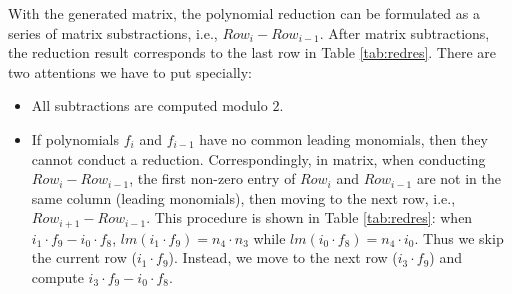 \begin{Example}
	With the generated matrix, the polynomial reduction can be formulated as a series of matrix substractions, 
	i.e., $Row_{i}- Row_{i-1}$. 
	After matrix subtractions, the reduction result corresponds to the last row in Table \ref{tab:redres}.
	There are two attentions we have to put specially:
	\begin{itemize}
	\item All subtractions are computed modulo $2$.
	\item If polynomials $f_{i}$ and $f_{i-1}$ have no common leading monomials, then they cannot conduct a reduction.
	Correspondingly, in matrix, when conducting $Row_{i}- Row_{i-1}$, the first non-zero entry of $Row_{i}$ and $Row_{i-1}$
	 are not in the same column (leading monomials), then moving to the next row, i.e., $Row_{i+1}-Row_{i-1}$. 
	 This procedure is shown in Table \ref{tab:redres}: when $i_1 \cdot f_{9} - i_0\cdot f_{8}$, 
	 $lm(i_1 \cdot f_{9})=n_{4}\cdot n_{3}$ while $lm(i_0\cdot f_{8})=n_{4}\cdot i_0$. Thus we skip the current row ($i_1 \cdot f_{9}$).
	 Instead, we move to the next row ($i_3 \cdot f_{9}$) and compute $i_3 \cdot f_{9}-i_0\cdot f_{8}$.
	\end{itemize}
	

\end{Example}
